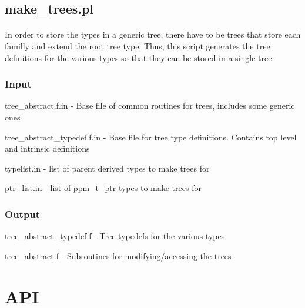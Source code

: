 \documentclass{article}
\begin{document}
\subsection{make\_trees.pl}
\paragraph{}
In order to store the types in a generic tree, there have to be trees that store each familly and extend the root tree type. Thus, this script generates the tree definitions for the various types so that they can be stored in a single tree.
\subsubsection{Input}
\begin{list}{}{}
\item tree\_abstract.f.in - Base file of common routines for trees, includes some generic ones
\item tree\_abstract\_typedef.f.in - Base file for tree type definitions. Contains top level and intrinsic definitions
\item typelist.in - list of parent derived types to make trees for
\item ptr\_list.in - list of ppm\_t\_ptr types to make trees for
\end{list}
\subsubsection{Output}
\begin{list}{}{}
\item tree\_abstract\_typedef.f - Tree typedefs for the various types
\item tree\_abstract.f - Subroutines for modifying/accessing the trees
\end{list}

\section{API}
\end{document}
